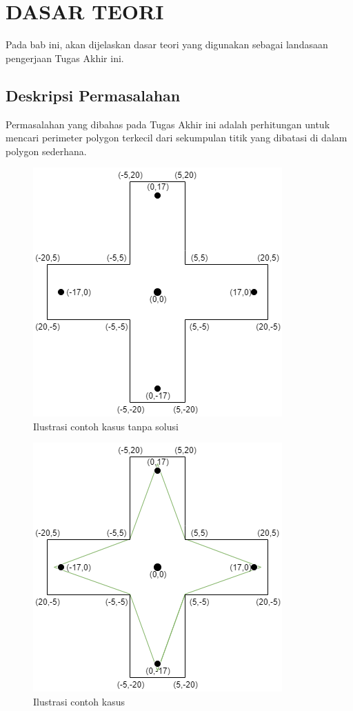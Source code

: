 \chapter {DASAR TEORI}

Pada bab ini, akan dijelaskan dasar teori yang digunakan sebagai landasaan pengerjaan Tugas Akhir ini.

\section{Deskripsi Permasalahan}
Permasalahan yang dibahas pada Tugas Akhir ini adalah perhitungan untuk mencari perimeter polygon terkecil dari sekumpulan titik yang dibatasi di dalam polygon sederhana.
\begin{figure}
	\Centering
	\includegraphics [width=0.5\columnwidth]{bab2/img/contoh-kasus-tanpa-solusi}
	\caption {Ilustrasi contoh kasus tanpa solusi}
	\label {fig:ilustrasi-contoh-kasus-tanpa-solusi}
\end{figure}
\begin{figure}
	\Centering
	\includegraphics [width=0.5\columnwidth]{bab2/img/contoh-kasus}
	\caption {Ilustrasi contoh kasus}
	\label {fig:ilustrasi-contoh-kasus}
\end{figure}



